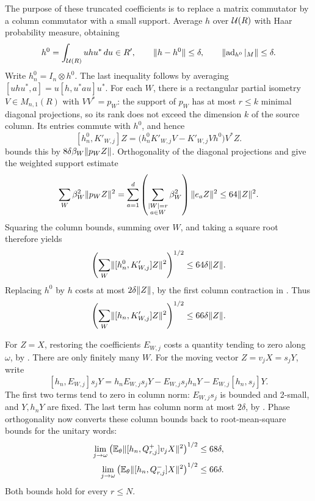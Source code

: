 The purpose of these truncated coefficients is to replace a matrix
commutator by a column commutator with a small support. Average \(h\)
over \(\mathcal U(R)\) with Haar probability measure, obtaining
\[
 h^0=\int_{\mathcal U(R)}uhu^*\,du\in R',\qquad
 \lVert h-h^0\rVert\le\delta,\qquad
 \lVert\operatorname{ad}_{h^0}|_M\rVert\le\delta.
\]
Write \(h_n^0=I_n\otimes h^0\).
The last inequality follows by averaging
\([uhu^*,a]=u[h,u^*au]u^*\).
For each \(W\), there is a rectangular partial isometry
\(V\in M_{n,1}(R)\) with \(VV^*=p_W\): the support of \(p_W\)
has at most \(r\le k\) minimal diagonal projections, so its rank
does not exceed the dimension \(k\) of the source column.
Its entries commute with \(h^0\), and hence
\[
 [h_n^0,K'_{W,j}]Z
 =\bigl(h_n^0K'_{W,j}V-K'_{W,j}Vh^0\bigr)V^*Z.
\]
 bounds this by
\(8\delta\beta_W\lVert p_WZ\rVert\). Orthogonality of the diagonal
projections and  give the weighted support
estimate
\[
 \sum_W\beta_W^2\lVert p_WZ\rVert^2
 =\sum_{a=1}^d\left(\sum_{\substack{|W|=r\\a\in W}}\beta_W^2\right)
       \lVert e_aZ\rVert^2
 \le64\lVert Z\rVert^2.
\]
Squaring the column bounds, summing over \(W\), and taking a square
root therefore yields
\[
 \left(\sum_W\lVert[h_n^0,K'_{W,j}]Z\rVert^2\right)^{1/2}
 \le64\delta\lVert Z\rVert.
\]
Replacing \(h^0\) by \(h\) costs at most \(2\delta\lVert Z\rVert\),
by the first column contraction in .
Thus
\begin{equation}\label{eq:clipped-drift}
 \left(\sum_W\lVert[h_n,K'_{W,j}]Z\rVert^2\right)^{1/2}
 \le66\delta\lVert Z\rVert.
\end{equation}

For \(Z=X\), restoring the coefficients \(E_{W,j}\) costs a quantity
tending to zero along \(\omega\), by .
There are only finitely many \(W\).
For the moving vector \(Z=v_jX=s_jY\), write
\[
 [h_n,E_{W,j}]s_jY
 =h_nE_{W,j}s_jY-E_{W,j}s_jh_nY
      -E_{W,j}[h_n,s_j]Y.
\]
The first two terms tend to zero in column norm: \(E_{W,j}s_j\)
is bounded and 2-small, and \(Y,h_nY\) are fixed.
The last term has column norm at most \(2\delta\), by
.
Phase orthogonality now converts these column bounds back to
root-mean-square bounds for the unitary words:
\begin{align}
 \lim_{j\to\omega}
 \left(\mathbb E_\theta\lVert[h_n,Q^+_{r,j}]v_jX\rVert^2\right)^{1/2}
 &\le68\delta,\label{eq:positive-drift}\\
 \lim_{j\to\omega}
 \left(\mathbb E_\theta\lVert[h_n,Q^-_{r,j}]X\rVert^2\right)^{1/2}
 &\le66\delta.\label{eq:negative-drift}
\end{align}
Both bounds hold for every \(r\le N\).

